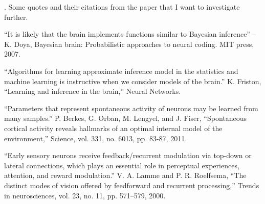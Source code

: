 \documentclass[11pt]{article}
\begin{document}
. Some quotes and their citations from the paper that I want to investigate further. 
\begin{compactitem}
	\item ``It is likely that the brain implements functions similar to Bayesian inference''  -- K. Doya, Bayesian brain: Probabilistic approaches to neural coding. MIT press, 2007.
	
	\item ``Algorithms for learning approximate inference model in the statistics and machine learning is instructive when we consider models of the brain.'' K. Friston, “Learning and inference in the brain,” Neural Networks. 
	
	\item ``Parameters that represent spontaneous activity of neurons may be learned from many samples.'' P. Berkes, G. Orban, M. Lengyel, and J. Fiser, “Spontaneous cortical activity reveals hallmarks of an optimal internal model of the environment,” Science, vol. 331, no. 6013, pp. 83-87,  2011.
	
	\item ``Early sensory neurons receive feedback/recurrent modulation via top-down or lateral connections, which plays an essential role in perceptual experiences, attention, and reward modulation.'' V. A. Lamme and P. R. Roelfsema, “The distinct modes of vision offered by feedforward and recurrent processing,” Trends in neurosciences, vol. 23, no. 11, pp. 571–579, 2000.
\end{compactitem}
\end{document}
